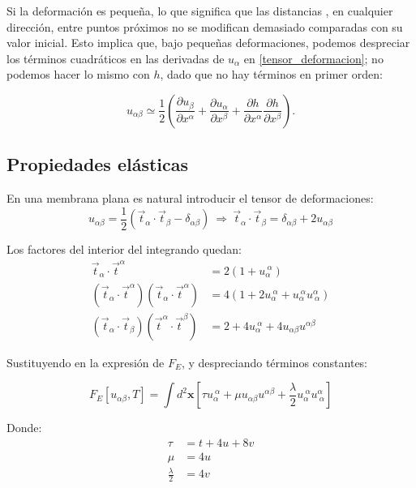 Si la deformación es pequeña, lo que significa que las distancias
, en cualquier dirección, entre puntos próximos no se modifican demasiado comparadas con
su valor inicial. Esto implica que, bajo pequeñas deformaciones, podemos
despreciar los términos cuadráticos en las derivadas de $u_{\alpha}$ en
\eqref{tensor_deformacion}; no podemos hacer lo mismo con $h$, dado que no hay
términos en primer orden: 

 \begin{equation}\label{u_aprox}
 u_{\alpha\beta}\simeq\frac{1}{2}\left(
  \frac{\partial u_{\beta}}{\partial x^{\alpha}}+
  \frac{\partial u_{\alpha}}{\partial x^{\beta}}+
 \frac{\partial h}{\partial  x^{\alpha}}\frac{\partial h}{\partial x^{\beta}}\right).
\end{equation}

\subsection{Propiedades elásticas}

En una membrana plana es natural introducir el tensor de deformaciones:
\begin{equation*}
u_{\alpha\beta}=\frac{1}{2}(\vec{t}_{\alpha}\cdot\vec{t}_{\beta}-\delta_{\alpha\beta})\
\Rightarrow \
\vec{t}_{\alpha}\cdot\vec{t}_{\beta}=\delta_{\alpha\beta}+2u_{\alpha\beta}
\end{equation*}

Los factores del interior del integrando quedan:
\begin{align}
\vec{t}_{\alpha}\cdot\vec{t}^{\alpha} &=2(1+u_{\alpha}^{\ \alpha})\\
(\vec{t}_{\alpha}\cdot\vec{t}^{\alpha})(\vec{t}_{\alpha}\cdot\vec{t}^{\alpha})&=4(1+2u_{\alpha}^{\
  \alpha}+u_{\alpha}^{\ \alpha}u^{\alpha}_{\ \alpha})\\
(\vec{t}_{\alpha}\cdot\vec{t}_{\beta})(\vec{t}^{\alpha}\cdot\vec{t}^{\beta})&=2+4u_{\alpha}^{\
  \alpha}+4u_{\alpha\beta}u^{\alpha\beta}
\end{align}

Sustituyendo en la expresión de $F_E$, y despreciando términos constantes:

\begin{equation}\label{Elibre_elastica}
F_E[u_{\alpha\beta},T]=\int d^2\mathbf{x}
\left[\tau u_{\alpha}^{\ \alpha}+
\mu u_{\alpha\beta}u^{\alpha\beta} +
\frac{\lambda}{2}u_{\alpha}^{\ \alpha}u^{\alpha}_{\ \alpha}\right]
\end{equation}

Donde:
\begin{align}
\tau&=t+4u+8v\label{tau}\\
\mu&=4u\\
\frac{\lambda}{2}&=4v
\end{align}

